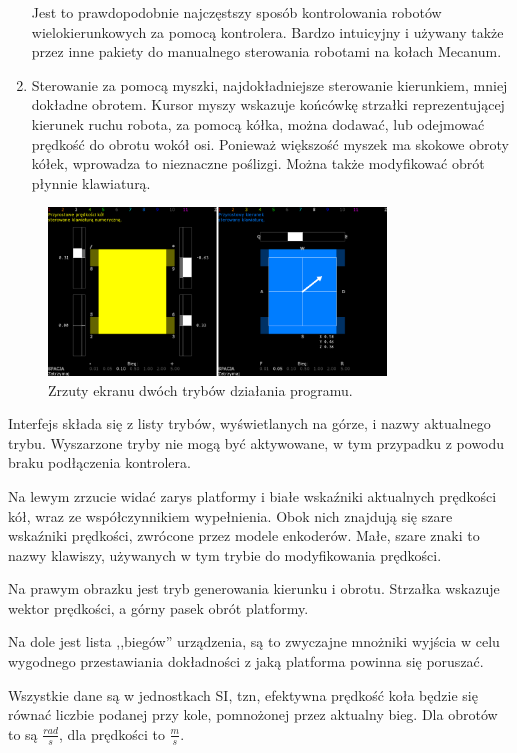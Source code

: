 \begin{enumerate}
			Jest to prawdopodobnie najczęstszy sposób kontrolowania robotów wielokierunkowych za pomocą kontrolera.
			Bardzo intuicyjny i używany także przez inne pakiety do manualnego sterowania robotami na kołach Mecanum.
			\item Sterowanie za pomocą myszki, najdokładniejsze sterowanie kierunkiem, mniej dokładne obrotem.
			Kursor myszy wskazuje końcówkę strzałki reprezentującej kierunek ruchu robota, za pomocą kółka, można dodawać, lub odejmować prędkość do obrotu wokół osi.
			Ponieważ większość myszek ma skokowe obroty kółek, wprowadza to nieznaczne poślizgi. Można także modyfikować obrót płynnie klawiaturą.
		\end{enumerate}
		
		\begin{figure}[H]
		\centering
		\includegraphics[width=0.8\textwidth]{graphics/lalkarz.png}
		\caption{Zrzuty ekranu dwóch trybów działania programu.}
		\label{fig:lalkarz}
		\end{figure}
		
		Interfejs składa się z listy trybów, wyświetlanych na górze, i nazwy aktualnego trybu.
		Wyszarzone tryby nie mogą być aktywowane, w tym przypadku z powodu braku podłączenia kontrolera.
		
		Na lewym zrzucie widać zarys platformy i białe wskaźniki aktualnych prędkości kół, wraz ze współczynnikiem wypełnienia.
		Obok nich znajdują się szare wskaźniki prędkości, zwrócone przez modele enkoderów.
		Małe, szare znaki to nazwy klawiszy, używanych w tym trybie do modyfikowania prędkości.
		
		Na prawym obrazku jest tryb generowania kierunku i obrotu. Strzałka wskazuje wektor prędkości, a górny pasek obrót platformy.
		
		Na dole jest lista ,,biegów'' urządzenia, są to zwyczajne mnożniki wyjścia w celu wygodnego przestawiania dokładności z jaką platforma powinna się poruszać.
		
		Wszystkie dane są w jednostkach SI, tzn, efektywna prędkość koła będzie się równać liczbie podanej przy kole, pomnożonej przez aktualny bieg.
		Dla obrotów to są $\frac{rad}{s}$, dla prędkości to $\frac{m}{s}$.
		
